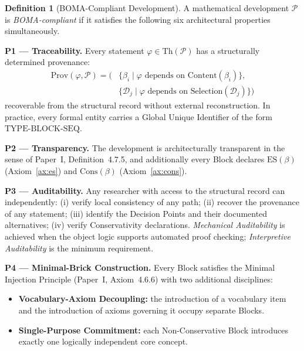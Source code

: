 \documentclass[12pt, a4paper]{article}
\theoremstyle{plain}
\theoremstyle{definition}
\newtheorem{definition}[theorem]{Definition}
\theoremstyle{remark}
\newcommand{\BOMA}{\textsf{BOMA}}
\newcommand{\Th}[1]{\mathrm{Th}(#1)}
\newcommand{\ES}[1]{\mathrm{ES}(#1)}
\newcommand{\Cons}[1]{\mathrm{Cons}(#1)}
\newcommand{\Prov}[2]{\mathrm{Prov}(#1,#2)}
\begin{document}
\begin{definition}[\BOMA{}-Compliant Development]
\label{def:compliant}
A mathematical development $\mathcal{P}$ is \emph{\BOMA{}-compliant}
if it satisfies the following six architectural properties
simultaneously.

\medskip
\noindent\textbf{P1 --- Traceability.}
Every statement $\varphi \in \Th{\mathcal{P}}$ has a structurally
determined provenance:
\begin{align*}
  \Prov{\varphi}{\mathcal{P}}
  = \bigl(&\{\beta_i \mid \varphi \text{ depends on }
    \mathrm{Content}(\beta_i)\},\\
    &\{\mathcal{D}_j \mid \varphi \text{ depends on }
    \mathrm{Selection}(\mathcal{D}_j)\}\bigr)
\end{align*}
recoverable from the structural record without external
reconstruction. In practice, every formal entity carries a Global
Unique Identifier of the form $\mathrm{TYPE\text{-}BLOCK\text{-}SEQ}$.

\medskip
\noindent\textbf{P2 --- Transparency.}
The development is architecturally transparent in the sense of
Paper~I, Definition~4.7.5, and additionally every Block declares
$\ES{\beta}$ (Axiom~\ref{ax:es}) and $\Cons{\beta}$
(Axiom~\ref{ax:cons}).

\medskip
\noindent\textbf{P3 --- Auditability.}
Any researcher with access to the structural record can independently:
(i) verify local consistency of any path;
(ii) recover the provenance of any statement;
(iii) identify the Decision Points and their documented alternatives;
(iv) verify Conservativity declarations.
\emph{Mechanical Auditability} is achieved when the object logic
supports automated proof checking; \emph{Interpretive Auditability}
is the minimum requirement.

\medskip
\noindent\textbf{P4 --- Minimal-Brick Construction.}
Every Block satisfies the Minimal Injection Principle (Paper~I,
Axiom~4.6.6) with two additional disciplines:

\begin{itemize}
  \item \textbf{Vocabulary-Axiom Decoupling:} the introduction of a
        vocabulary item and the introduction of axioms governing it
        occupy separate Blocks.
  \item \textbf{Single-Purpose Commitment:} each Non-Conservative
        Block introduces exactly one logically independent core
        concept.
\end{itemize}


\end{definition}
\end{document}
